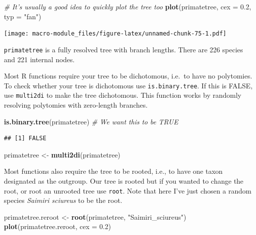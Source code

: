 \documentclass[]{book}
\newenvironment{Shaded}{\begin{snugshade}}{\end{snugshade}}
\newcommand{\KeywordTok}[1]{\textcolor[rgb]{0.13,0.29,0.53}{\textbf{{#1}}}}
\newcommand{\DataTypeTok}[1]{\textcolor[rgb]{0.13,0.29,0.53}{{#1}}}
\newcommand{\FloatTok}[1]{\textcolor[rgb]{0.00,0.00,0.81}{{#1}}}
\newcommand{\StringTok}[1]{\textcolor[rgb]{0.31,0.60,0.02}{{#1}}}
\newcommand{\CommentTok}[1]{\textcolor[rgb]{0.56,0.35,0.01}{\textit{{#1}}}}
\newcommand{\NormalTok}[1]{{#1}}
\begin{document}
\begin{Shaded}
\begin{Highlighting}[]
\CommentTok{# It's usually a good idea to quickly plot the tree too}
\KeywordTok{plot}\NormalTok{(primatetree, }\DataTypeTok{cex =} \FloatTok{0.2}\NormalTok{, }\DataTypeTok{typ =} \StringTok{"fan"}\NormalTok{)}
\end{Highlighting}
\end{Shaded}

\texttt{[image: macro-module\_files/figure-latex/unnamed-chunk-75-1.pdf]}

\texttt{primatetree} is a fully resolved tree with branch lengths. There
are 226 species and 221 internal nodes.

Most R functions require your tree to be dichotomous, i.e.~to have no
polytomies. To check whether your tree is dichotomous use
\texttt{is.binary.tree}. If this is FALSE, use \texttt{multi2di} to make
the tree dichotomous. This function works by randomly resolving
polytomies with zero-length branches.

\begin{Shaded}
\begin{Highlighting}[]
\KeywordTok{is.binary.tree}\NormalTok{(primatetree) }\CommentTok{# We want this to be TRUE}
\end{Highlighting}
\end{Shaded}

\begin{verbatim}
## [1] FALSE
\end{verbatim}

\begin{Shaded}
\begin{Highlighting}[]
\NormalTok{primatetree <-}\StringTok{ }\KeywordTok{multi2di}\NormalTok{(primatetree)}
\end{Highlighting}
\end{Shaded}

Most functions also require the tree to be rooted, i.e., to have one
taxon designated as the outgroup. Our tree is rooted but if you wanted
to change the root, or root an unrooted tree use \texttt{root}. Note
that here I've just chosen a random species \emph{Saimiri sciureus} to
be the root.

\begin{Shaded}
\begin{Highlighting}[]
\NormalTok{primatetree.reroot <-}\StringTok{ }\KeywordTok{root}\NormalTok{(primatetree, }\StringTok{"Saimiri_sciureus"}\NormalTok{)}
\KeywordTok{plot}\NormalTok{(primatetree.reroot, }\DataTypeTok{cex =} \FloatTok{0.2}\NormalTok{)}
\end{Highlighting}
\end{Shaded}
\end{document}
